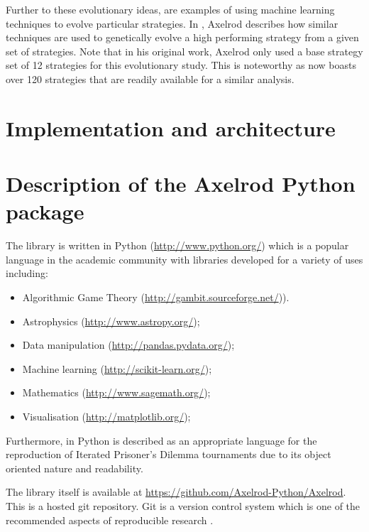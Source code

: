 \documentclass{jors}
\begin{document}
Further to these evolutionary ideas, \cite{Chellapilla1999, DavidB1993} are
examples of using machine learning techniques to evolve particular strategies.
In \cite{Axelrod}, Axelrod describes how similar techniques are used to
genetically evolve a high performing strategy from a given set of strategies.
Note that in his original work, Axelrod only used a base strategy set of 12
strategies for this evolutionary study. This is noteworthy as
\cite{Axelrod-Pythonprojectteam2015} now boasts over 120 strategies that are
readily available for a similar analysis.

\section*{Implementation and architecture}

\section*{Description of the Axelrod Python package}\label{sec:description-of-axelrod-python}

The library is written in Python (\url{http://www.python.org/}) which is a
popular language in the academic community with libraries developed for a
variety of uses including:

\begin{itemize}[noitemsep,topsep=0pt]
    \item Algorithmic Game Theory \cite{Mckelvey06gambit:software}
          (\url{http://gambit.sourceforge.net/})).
    \item Astrophysics \cite{astropy} (\url{http://www.astropy.org/});
    \item Data manipulation \cite{mckinney-proc-scipy-2010}
          (\url{http://pandas.pydata.org/});
    \item Machine learning \cite{scikit-learn} (\url{http://scikit-learn.org/});
    \item Mathematics \cite{sage} (\url{http://www.sagemath.org/});
    \item Visualisation \cite{Hunter:2007} (\url{http://matplotlib.org/});
\end{itemize}

Furthermore, in \cite{Isaac2008} Python is described as an appropriate language for the
reproduction of Iterated Prisoner's Dilemma tournaments due to its object
oriented nature and readability.

The library itself is available at
\url{https://github.com/Axelrod-Python/Axelrod}. This is a hosted git
repository. Git is a version control system which is one of the
recommended aspects of reproducible research \cite{Crick2014a, Sandve2013}.
\end{document}
